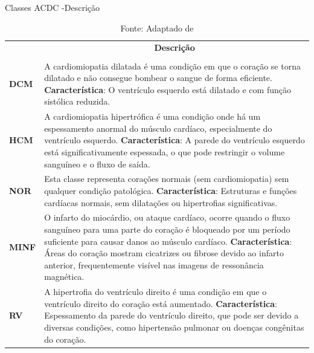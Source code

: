 \begin{table}[H]
    \centering
    \caption{Classes ACDC -Descrição}
    \renewcommand{\arraystretch}{1} %
    \begin{tabular}{|>{\centering\arraybackslash}p{2cm}|p{12cm}|}
    \hline 
          \multicolumn{1}{|c|}{\textbf{Condição}} & \multicolumn{1}{c|}{\textbf{Descrição}} \\
          & \\
    \hline 
        \textbf{DCM} &
        A cardiomiopatia dilatada é uma condição em que o coração se 
        torna dilatado e não consegue bombear o sangue de forma
        eficiente. 
        \newline \newline
        \textbf{Característica}: O ventrículo esquerdo está dilatado e com função sistólica reduzida. \\ 
    \hline
        \textbf{HCM} & 
        A cardiomiopatia hipertrófica é uma condição onde há um espessamento anormal do músculo cardíaco, especialmente do ventrículo esquerdo. 
        \newline \newline
        \textbf{Característica}: A parede do ventrículo esquerdo está significativamente espessada, o que pode restringir o volume sanguíneo e o fluxo de saída. \\ 
    \hline
        \textbf{NOR} & 
        Esta classe representa corações normais (sem cardiomiopatia) sem qualquer condição patológica. 
        \newline \newline
        \textbf{Característica}: Estruturas e funções cardíacas normais, sem dilatações ou hipertrofias significativas. \\ 
    \hline
        \textbf{MINF} & 
        O infarto do miocárdio, ou ataque cardíaco, ocorre quando o fluxo sanguíneo para uma parte do coração é bloqueado por um período suficiente para causar danos ao músculo cardíaco. 
        \newline \newline
        \textbf{Característica}: Áreas do coração mostram cicatrizes ou fibrose devido ao infarto anterior, frequentemente visível nas imagens de ressonância magnética. \\ 
    \hline
        \textbf{RV} & 
        A hipertrofia do ventrículo direito é uma condição em que o ventrículo direito do coração está aumentado. 
        \newline \newline
        \textbf{Característica}: Espessamento da parede do ventrículo direito, que pode ser devido a diversas condições, como hipertensão pulmonar ou doenças congênitas do coração. \\
    \hline
    \end{tabular} 
    \caption*{Fonte: Adaptado de \cite{bernardDeepLearningTechniques2018a}}
    \label{tab:conditions}
\end{table}


